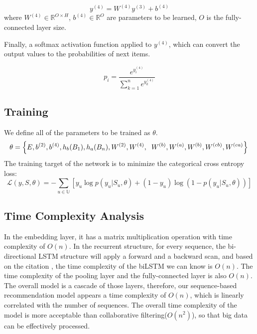 \documentclass[runningheads]{llncs}
\begin{document}
\begin{equation}
y^{(4)}=W^{(4)}y^{(3)}+b^{(4)}
\end{equation}
where $W^{(4)}\in \mathbb{R}^{O\times H}$, $b^{(4)}\in \mathbb{R}^{O}$ are parameters to be learned, $O$ is the fully-connected layer size.

Finally, a softmax activation function applied to $y^{(4)}$, which can convert the output values to the probabilities of next items. 

\begin{equation}
p_{i}= \frac{e^{y_{i}^{(4)}}}{\sum_{k=1}^{n}e^{y_{k}^{(4)}}}
\end{equation}

\subsection{Training}

We define all of the parameters to be trained as $\theta $.
\begin{equation}
\theta=  \left \{ E,b^{(2)},b^{(4)},h_{b}(B_{1}),h_{a}(B_{n}),W^{(2)}, W^{(4)},\right.\\
\left.W^{(b)},W^{(a)},W^{(b)},W^{(cb)},W^{(ca)} \right \} \\
\end{equation}
The training target of the network is to minimize the categorical cross entropy loss:
\begin{equation}
\mathcal{L}(y,S,\theta )=-\sum_{u\in \mathbb{U}}[y_{u}\log p(y_{u}|S_{u},\theta)+(1-y_{u})\log (1-p(y_{u}|S_{u},\theta ))]
\end{equation}
\subsection{Time Complexity Analysis}

In the embedding layer, it has a matrix multiplication operation with time complexity of $O(n)$. In the recurrent structure, for every sequence, the bi-directional LSTM structure will apply a forward and a backward scan, and based on the citation \cite{Sak2014Long}, the time complexity of the biLSTM we can know is $O(n)$. The time complexity of the pooling layer and the fully-connected layer is also $O(n)$. The overall model is a cascade of those layers, therefore, our sequence-based recommendation model appears a time complexity of $O(n)$, which is linearly correlated with the number of sequences. The overall time complexity of the model is more acceptable than collaborative filtering($O(n^{2})$)\cite{Resnick:1994:GOA:192844.192905,sarwar2001item}, so that big data can be effectively processed.
\end{document}
